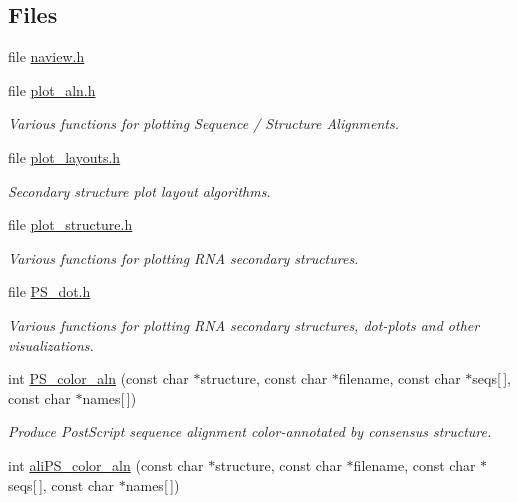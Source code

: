 \subsection*{Files}
\begin{DoxyCompactItemize}
\item 
file \hyperlink{naview_8h}{naview.\+h}
\item 
file \hyperlink{plot__aln_8h}{plot\+\_\+aln.\+h}
\begin{DoxyCompactList}\small\item\em Various functions for plotting Sequence / Structure Alignments. \end{DoxyCompactList}\item 
file \hyperlink{plot__layouts_8h}{plot\+\_\+layouts.\+h}
\begin{DoxyCompactList}\small\item\em Secondary structure plot layout algorithms. \end{DoxyCompactList}\item 
file \hyperlink{plot__structure_8h}{plot\+\_\+structure.\+h}
\begin{DoxyCompactList}\small\item\em Various functions for plotting R\+NA secondary structures. \end{DoxyCompactList}\item 
file \hyperlink{PS__dot_8h}{P\+S\+\_\+dot.\+h}
\begin{DoxyCompactList}\small\item\em Various functions for plotting R\+NA secondary structures, dot-\/plots and other visualizations. \end{DoxyCompactList}\end{DoxyCompactItemize}
\begin{DoxyCompactItemize}
\item 
int \hyperlink{group__plotting__utils_ga821802c3685e37e15182341f6217470d}{P\+S\+\_\+color\+\_\+aln} (const char $\ast$structure, const char $\ast$filename, const char $\ast$seqs\mbox{[}$\,$\mbox{]}, const char $\ast$names\mbox{[}$\,$\mbox{]})\hypertarget{group__plotting__utils_ga821802c3685e37e15182341f6217470d}{}\label{group__plotting__utils_ga821802c3685e37e15182341f6217470d}

\begin{DoxyCompactList}\small\item\em Produce Post\+Script sequence alignment color-\/annotated by consensus structure. \end{DoxyCompactList}\item 
int \hyperlink{group__plotting__utils_gaab48d4dac655d688abe921389ac2847c}{ali\+P\+S\+\_\+color\+\_\+aln} (const char $\ast$structure, const char $\ast$filename, const char $\ast$seqs\mbox{[}$\,$\mbox{]}, const char $\ast$names\mbox{[}$\,$\mbox{]})
\end{DoxyCompactItemize}
